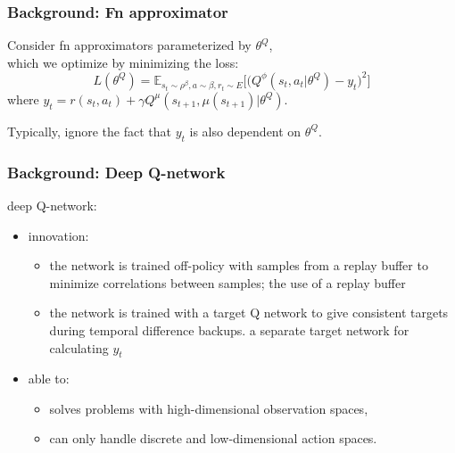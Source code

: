 \begin{frame}
\frametitle{Background: Fn approximator}
Consider fn approximators parameterized by $\theta^Q$, \\
which we optimize by minimizing the loss:
\begin{equation*}
L(\theta^Q) =\mathbb{E}_{s_t \sim \rho^{\beta}, a \sim \beta, r_t \sim E} \Big[ \Big( Q^{\phi} (s_t,a_t|\theta^Q) - y_t \Big)^2 \Big]
\end{equation*}
where $y_t = r(s_t,a_t) + \gamma Q^{\mu}(s_{t+1},\mu(s_{t+1}) | \theta^Q)$.

Typically, ignore the fact that $y_t$ is also dependent on $\theta^Q$.

\end{frame}


\begin{frame}
\frametitle{Background: Deep Q-network \cite{Mnih2013}}
deep Q-network:
\begin{itemize}
  \item innovation:
  \begin{itemize}
    \item the network is trained off-policy with samples from a replay buffer to minimize correlations between samples;
    the use of a replay buffer
    \item the network is trained with a target Q network to give consistent targets during temporal difference backups.
    a separate target network for calculating $y_t$
  \end{itemize}
  \item able to:
  \begin{itemize}
    \item solves problems with high-dimensional observation spaces,
    \item can only handle discrete and low-dimensional action spaces.
  \end{itemize}
\end{itemize}

\end{frame}

